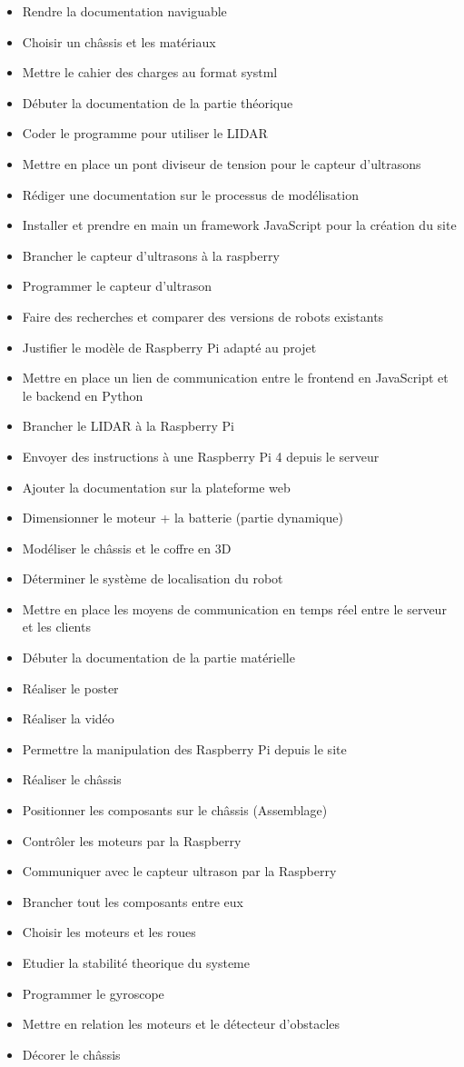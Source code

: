 \documentclass[a4paper,12pt]{report}  %
\begin{document}
\begin{itemize}
	\item Rendre la documentation naviguable
	\item Choisir un châssis et les matériaux
	\item Mettre le cahier des charges au format systml
	\item Débuter la documentation de la partie théorique
	\item Coder le programme pour utiliser le LIDAR
	\item Mettre en place un pont diviseur de tension pour le capteur d'ultrasons
	\item Rédiger une documentation sur le processus de modélisation 
	\item Installer et prendre en main un framework JavaScript pour la création du site 
	\item Brancher le capteur d'ultrasons à la raspberry
	\item Programmer le capteur d'ultrason
	\item Faire des recherches et comparer des versions de robots existants
	\item Justifier le modèle de Raspberry Pi adapté au projet
	\item Mettre en place un lien de communication entre le frontend en JavaScript et le backend en Python
	\item Brancher le LIDAR à la Raspberry Pi
	\item Envoyer des instructions à une Raspberry Pi 4 depuis le serveur
	\item Ajouter la documentation sur la plateforme web
	\item Dimensionner le moteur + la batterie (partie dynamique)
	\item Modéliser le châssis et le coffre en 3D
	\item Déterminer le système de localisation du robot
	\item Mettre en place les moyens de communication en temps réel entre le serveur et les clients
	\item Débuter la documentation de la partie matérielle
	\item Réaliser le poster
	\item Réaliser la vidéo
	\item Permettre la manipulation des Raspberry Pi depuis le site
	\item Réaliser le châssis
	\item Positionner les composants sur le châssis (Assemblage)
	\item Contrôler les moteurs par la Raspberry
	\item Communiquer avec le capteur ultrason par la Raspberry
	\item Brancher tout les composants entre eux
	\item Choisir les moteurs et les roues
	\item Etudier la stabilité theorique du systeme 
	\item Programmer le gyroscope
	\item Mettre en relation les moteurs et le détecteur d'obstacles
	\item Décorer le châssis
\end{itemize}
\end{document}
